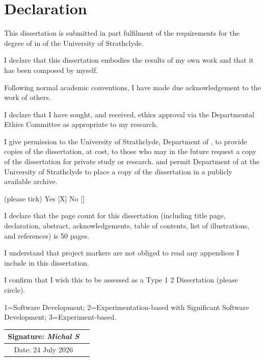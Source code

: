 \section*{Declaration}
This dissertation is submitted in part fulfilment of the requirements for the degree of \degreename
in \coursename of the University of Strathclyde. 

I declare that this dissertation embodies the results of my own work and that it has been composed by myself. 

Following normal academic conventions, I have made due acknowledgement to the work of others. 

I declare that I have sought, and received, ethics approval via the Departmental Ethics Committee as appropriate to my research. 

I give permission to the University of Strathclyde, Department of \deptname, to provide copies of the dissertation, at cost, to those who may in the future request a copy of the dissertation for private study or research. 
and permit  Department of \deptname at the University of Strathclyde to place a copy of the dissertation in a publicly available archive. 

(please tick) Yes [X] No [\quad] 

I declare that the page count for this dissertation (including title page, declaration, abstract, acknowledgements, table of contents, list of illustrations, and references) is 50 pages. %

I understand that project markers are not obliged to read any appendices I include in this dissertation.


I confirm that I wish this to be assessed as a Type 1 2   Dissertation (please circle).

{\small 1=Software Development;
2=Experimentation-based with Significant Software Development;
3=Experiment-based.}


\begin{tabular}{|c|p{8cm}|}
\hline
Signature:  \textit{Michal S} &  \\ \hline
 Date:    24 July 2026 & \\ \hline
\end{tabular}

